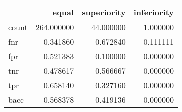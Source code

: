 \begin{tabular}{lrrr}
\toprule
{} &       equal &  superiority &  inferiority \\
\midrule
count &  264.000000 &    44.000000 &     1.000000 \\
fnr   &    0.341860 &     0.672840 &     0.111111 \\
fpr   &    0.521383 &     0.100000 &     0.000000 \\
tnr   &    0.478617 &     0.566667 &     0.000000 \\
tpr   &    0.658140 &     0.327160 &     0.000000 \\
bacc  &    0.568378 &     0.419136 &     0.000000 \\
\bottomrule
\end{tabular}
